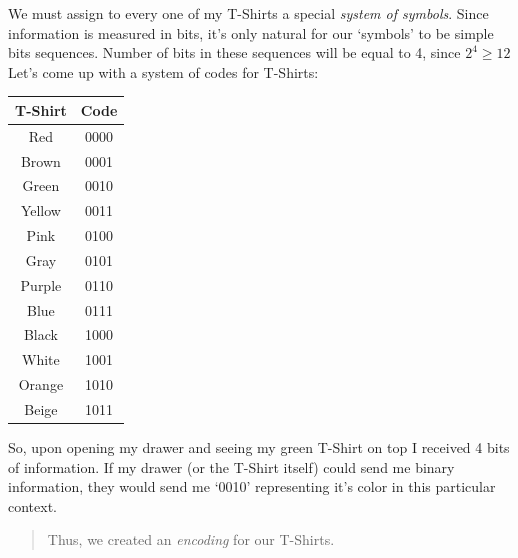 \documentclass{article}
\begin{document}
            We must assign to every one of my T-Shirts a special \emph{system of symbols}. Since information is measured in bits, it's only natural for our `symbols' to 
            be simple bits sequences. Number of bits in these sequences will be equal to 4, since $2^4 \geq 12$\\
            Let's come up with a system of codes for T-Shirts:

            \begin{center}
                \begin{longtable}{|c|c|}
                    \hline
                    T-Shirt & Code \\\hline
                    Red & 0000 \\\hline
                    Brown & 0001 \\\hline
                    Green & 0010 \\\hline
                    Yellow & 0011 \\\hline
                    Pink & 0100 \\\hline
                    Gray & 0101 \\\hline
                    Purple & 0110 \\\hline
                    Blue & 0111 \\\hline
                    Black & 1000 \\\hline
                    White & 1001 \\\hline 
                    Orange & 1010 \\\hline
                    Beige & 1011 \\\hline
                \end{longtable}
            \end{center}

            So, upon opening my drawer and seeing my green T-Shirt on top I received 4 bits of information. If my drawer (or the T-Shirt itself) could send me binary
            information, they would send me `0010' representing it's color in this particular context.\par

            \begin{quote}
                Thus, we created an \emph{encoding} for our T-Shirts.
            \end{quote}

            \newpage
\end{document}
